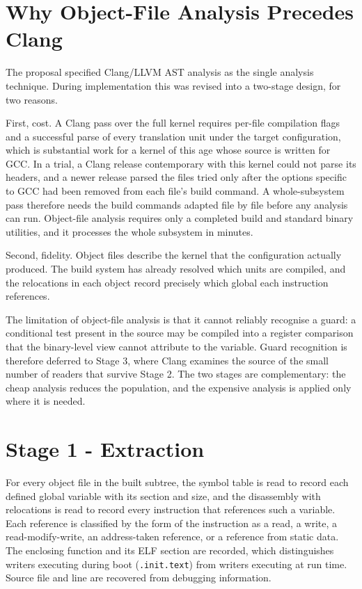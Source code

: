 \documentclass[12pt, a4paper, oneside]{book}
\begin{document}
\section{Why Object-File Analysis Precedes Clang}

The proposal specified Clang/LLVM AST analysis as the single analysis technique.
During implementation this was revised into a two-stage design, for two reasons.

First, cost. A Clang pass over the full kernel requires per-file compilation
flags and a successful parse of every translation unit under the target
configuration, which is substantial work for a kernel of this age whose source is
written for GCC. In a trial, a Clang release contemporary with this kernel could
not parse its headers, and a newer release parsed the files tried only after the
options specific to GCC had been removed from each file's build command. A
whole-subsystem pass therefore needs the build commands adapted file by file
before any analysis can run. Object-file analysis requires only a completed build
and standard binary utilities, and it processes the whole subsystem in minutes.

Second, fidelity. Object files describe the kernel that the configuration
actually produced. The build system has already resolved which units are
compiled, and the relocations in each object record precisely which global each
instruction references.

The limitation of object-file analysis is that it cannot reliably recognise a
guard: a conditional test present in the source may be compiled into a register
comparison that the binary-level view cannot attribute to the variable. Guard
recognition is therefore deferred to Stage 3, where Clang examines the source of
the small number of readers that survive Stage 2. The two stages are complementary:
the cheap analysis reduces the population, and the expensive analysis is applied
only where it is needed.

\section{Stage 1 - Extraction}

For every object file in the built subtree, the symbol table is read to record
each defined global variable with its section and size, and the disassembly with
relocations is read to record every instruction that references such a variable.
Each reference is classified by the form of the instruction as a read, a write, a
read-modify-write, an address-taken reference, or a reference from static data.
The enclosing function and its ELF section are recorded, which distinguishes
writers executing during boot (\texttt{.init.text}) from writers executing at run
time. Source file and line are recovered from debugging information.
\end{document}
